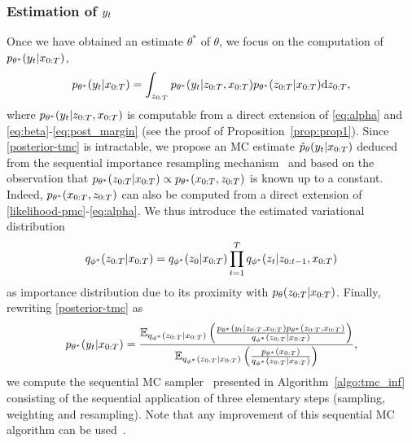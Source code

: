 \subsubsection{Estimation of $y_t$}
\label{estimation-h-tmc}
Once we have obtained an estimate ${\theta^*}$
of $\theta$, we focus on the computation
of $p_{\theta^*}(y_t|x_{0:T})$, 
\begin{equation}
\label{posterior-tmc}
p_{\theta^* }(y_t|x_{0:T})=\int_{z_{0:T}} p_{\theta^*}(y_t|z_{0:T},x_{0:T})p_{\theta^*}(z_{0:T}|x_{0:T}) \mathrm{d}z_{0:T} \text{,}
\end{equation}
where $p_{\theta^*}(y_t|z_{0:T},x_{0:T})$ 
is computable from a direct extension 
of \eqref{eq:alpha} and \eqref{eq:beta}-\eqref{eq:post_margin}
(see the proof of Proposition~\ref{prop:prop1}).
Since \eqref{posterior-tmc} is intractable, we propose an MC estimate $\hat{p}_{\theta }(y_t|x_{0:T})$ deduced from the sequential importance resampling mechanism~\citep{livredoucetshort}
and based on the observation
that $p_{\theta^*}(z_{0:T}|x_{0:T}) \propto
p_{\theta^*}(x_{0:T},z_{0:T})$ is
known up to a constant. Indeed, $p_{\theta^*}(x_{0:T},z_{0:T})$ 
can also be computed from a direct extension of \eqref{likelihood-pmc}-\eqref{eq:alpha}.
We thus introduce the estimated variational distribution
$$q_{\phi^*}(z_{0:T}|x_{0:T})=
q_{\phi^*}(z_0|x_{0:T})\prod_{t=1}^T q_{\phi^*}(z_t|z_{0:t-1},x_{0:T})$$
as importance distribution due to its proximity with $p_{\theta}(z_{0:T}|x_{0:T})$.
Finally, rewriting \eqref{posterior-tmc} as 
\begin{equation}
p_{\theta^*}(y_t|x_{0:T})=\frac{{\mathbb{E}}_{q_{\phi^*}(z_{0:T}|x_{0:T})}\left(
    \frac{p_{\theta^*}(y_t|z_{0:T},x_{0:T})p_{\theta^*}(z_{0:T},x_{0:T})}{q_{\phi^*}(z_{0:T}|x_{0:T})}\right)}{{\mathbb{E}}_{q_{\phi^*}(z_{0:T}|x_{0:T})}\left(\frac{p_{\theta^*}(x_{0:T})}{q_{\phi^*}(z_{0:T}|x_{0:T})}\right)} \text{,}
\end{equation}
we compute the sequential MC sampler~\citep{doucet2009tutorial} presented
in Algorithm~\ref{algo:tmc_inf} consisting of the sequential application of three elementary steps (sampling, weighting and resampling). Note that any improvement of this sequential MC algorithm can be used~\citep{Fearnhead-smoothing}.

